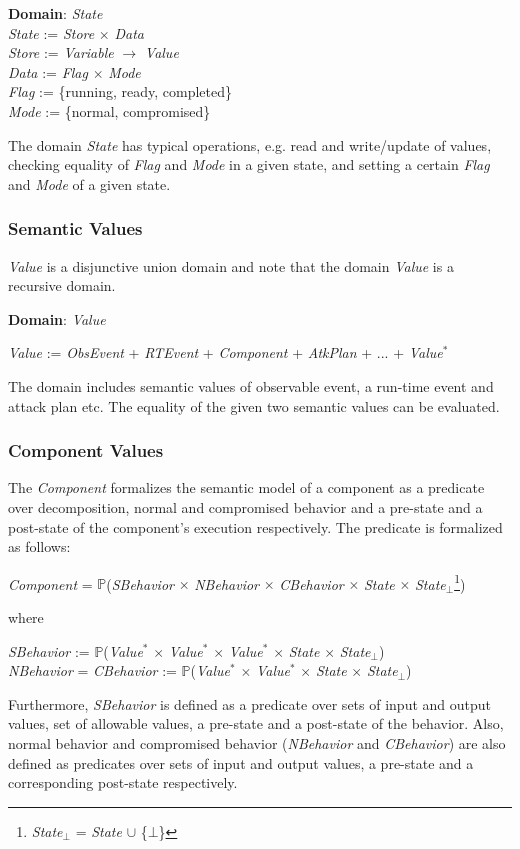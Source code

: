 \documentclass[conference]{IEEEtran}
\begin{document}
\noindent\textbf{Domain}: \emph{State}\\
\emph{State} := \emph{Store} $\times$ \emph{Data}\\
\emph{Store} := \emph{Variable} $\rightarrow$ \emph{Value}\\
\emph{Data} := \emph{Flag} $\times$ \emph{Mode}\\
\emph{Flag} := \{running, ready, completed\}\\
\emph{Mode} := \{normal, compromised\}


The domain \emph{State} has typical operations, e.g. read and write/update of values, checking equality of \emph{Flag} and \emph{Mode} in a given state, and setting a certain \emph{Flag} and \emph{Mode} of a given state. 

\subsubsection*{Semantic Values}
\emph{Value} is a disjunctive union domain and note that the domain \emph{Value} is a recursive domain.

\noindent\textbf{Domain}: \emph{Value}
\begin{tabbing}
\emph{Value} := \emph{ObsEvent} + \emph{RTEvent} + \emph{Component} + \emph{AtkPlan} + ... + \emph{Value}$^*$
\end{tabbing}
The domain includes semantic values of observable event, a run-time event and attack plan etc.
The equality of the given two semantic values can be evaluated.
\subsubsection*{Component Values}
The \emph{Component} formalizes the semantic model of a component as a predicate over decomposition, normal and compromised behavior and a pre-state and a post-state of the component's execution respectively. The predicate is formalized as follows:
\begin{center}
\emph{Component} = $\mathbb{P}$(\emph{SBehavior} $\times$ \emph{NBehavior} $\times$ \emph{CBehavior} $\times$ \emph{State} $\times$ \emph{State}$_\bot$\footnote[3]{\emph{State}$_\bot$ = \emph{State} $\cup$ \{$\bot$\}})
\end{center}
where
\begin{tabbing}
\emph{SBehavior} := $\mathbb{P}$(\emph{Value}$^*$ $\times$ \emph{Value}$^*$ $\times$ \emph{Value}$^*$ $\times$ \emph{State} $\times$ \emph{State}$_\bot$)\\
\emph{NBehavior} = \emph{CBehavior} := $\mathbb{P}$(\emph{Value}$^*$ $\times$ \emph{Value}$^*$ $\times$ \emph{State} $\times$ \emph{State}$_\bot$)
\end{tabbing}
Furthermore, \emph{SBehavior} is defined as a predicate over sets of input and output values, set of allowable values, a pre-state and a post-state of the behavior. Also, normal behavior and compromised behavior (\emph{NBehavior} and \emph{CBehavior}) are also defined as predicates over sets of input and output values, a pre-state and a corresponding post-state respectively. 
\end{document}
